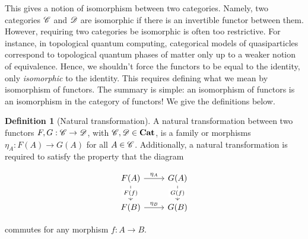 \documentclass{article}
\theoremstyle{definition}
\newtheorem*{definition}{Definition}
\numberwithin{figure}{section}
\begin{document}
This gives a notion of isomorphism between two categories. Namely, two categories $\mathscr{C}$ and $\mathscr{D}$ are isomorphic if there is an invertible functor between them. However, requiring two categories be isomorphic is often too restrictive. For instance, in topological quantum computing, categorical models of quasiparticles correspond to topological quantum phases of matter only up to a weaker notion of equivalence.  Hence, we shouldn't force the functors to be equal to the identity, only \textit{isomorphic} to the identity. This requires defining what we mean by isomorphism of functors. The summary is simple: an isomorphism of functors is an isomorphism in the category of functors! We give the definitions below.

\begin{definition}[Natural transformation] A natural transformation between two functors $F,G: \mathscr{C}\to \mathscr{D}$, with $\mathscr{C},\mathscr{D}\in \bold{Cat}$, is a family or morphisms $\eta_A: F(A)\to G(A)$ for all $A\in \mathscr{C}$. Additionally, a natural transformation is required to satisfy the property that the diagram

\[\begin{tikzcd}
	{F(A)} & {G(A)} \\
	{F(B)} & {G(B)}
	\arrow["{\eta_B}", from=2-1, to=2-2]
	\arrow["{\eta_A}", from=1-1, to=1-2]
	\arrow["{F(f)}"{description}, from=1-1, to=2-1]
	\arrow["{G(f)}"{description}, from=1-2, to=2-2]
\end{tikzcd}\]

commutes for any morphism $f:A\to B$.

\raggedleft\qedsymbol{}
\end{definition}
\end{document}
